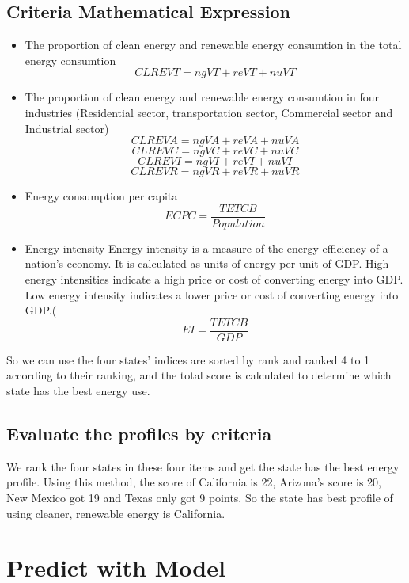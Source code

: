 \documentclass{mcmthesis}
\begin{document}
\subsection{Criteria Mathematical Expression}
\begin{itemize}
  \item The proportion of clean energy and renewable energy consumtion in the total energy consumtion
        $$ CLREVT = ngVT + reVT + nuVT $$
  \item The proportion of clean energy and renewable energy consumtion in four industries (Residential sector, transportation sector, Commercial sector and Industrial sector)
        $$ CLREVA = ngVA + reVA + nuVA$$
        $$ CLREVC = ngVC + reVC + nuVC$$
        $$ CLREVI = ngVI + reVI + nuVI$$
        $$ CLREVR = ngVR + reVR + nuVR$$
  \item Energy consumption per capita
        $$ ECPC = \frac{TETCB}{Population}$$
  \item Energy intensity
        Energy intensity is a measure of the energy efficiency of a nation's economy. It is calculated as units of energy per unit of GDP.
        High energy intensities indicate a high price or cost of converting energy into GDP.
        Low energy intensity indicates a lower price or cost of converting energy into GDP.(%
        $$ EI = \frac{TETCB}{GDP} $$
\end{itemize}
So we can use the four states' indices are sorted by rank and ranked 4 to 1 according to their ranking, and the total score is calculated to determine which state has the best energy use.
\subsection{Evaluate the profiles by criteria }
We rank the four states in these four items and get the state has the best energy profile.
Using this method, the score of California is 22, Arizona's score is 20, New Mexico got 19 and Texas only got 9 points. So the state has best profile of using cleaner, renewable energy is
California.

\section{Predict with Model}
\end{document}
